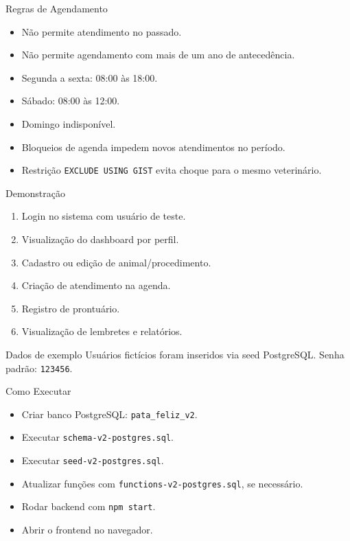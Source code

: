 \documentclass[aspectratio=169,11pt]{beamer}
\begin{document}
\begin{frame}{Regras de Agendamento}
  \begin{itemize}
    \item Não permite atendimento no passado.
    \item Não permite agendamento com mais de um ano de antecedência.
    \item Segunda a sexta: 08:00 às 18:00.
    \item Sábado: 08:00 às 12:00.
    \item Domingo indisponível.
    \item Bloqueios de agenda impedem novos atendimentos no período.
    \item Restrição \texttt{EXCLUDE USING GIST} evita choque para o mesmo veterinário.
  \end{itemize}
\end{frame}

\begin{frame}{Demonstração}
  \begin{enumerate}
    \item Login no sistema com usuário de teste.
    \item Visualização do dashboard por perfil.
    \item Cadastro ou edição de animal/procedimento.
    \item Criação de atendimento na agenda.
    \item Registro de prontuário.
    \item Visualização de lembretes e relatórios.
  \end{enumerate}

  \begin{block}{Dados de exemplo}
    Usuários fictícios foram inseridos via seed PostgreSQL. Senha padrão: \texttt{123456}.
  \end{block}
\end{frame}

\begin{frame}{Como Executar}
  \begin{itemize}
    \item Criar banco PostgreSQL: \texttt{pata\_feliz\_v2}.
    \item Executar \texttt{schema-v2-postgres.sql}.
    \item Executar \texttt{seed-v2-postgres.sql}.
    \item Atualizar funções com \texttt{functions-v2-postgres.sql}, se necessário.
    \item Rodar backend com \texttt{npm start}.
    \item Abrir o frontend no navegador.
  \end{itemize}
\end{frame}
\end{document}
